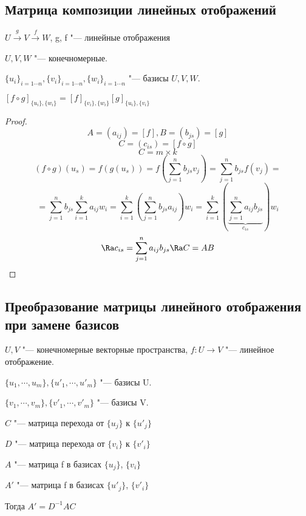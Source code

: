 \subsection{Матрица композиции линейных отображений}
\begin{theorem}
$U\overset{g}{\rightarrow}V\overset{f}{\rightarrow}W$, g, f "--- линейные отображения

$U, V, W$ "--- конечномерные.

$\{u_{i}\}_{i = 1 \cdots n}, \{v_{i}\}_{i = 1 \cdots n}, \{w_{i}\}_{i = 1 \cdots n}$ "--- базисы $U, V, W$.

$[f \circ g]_{\{u_i\}, \{w_i\}} = [f]_{\{v_i\}, \{w_i\}}[g]_{\{u_i\}, \{v_i\}}$
\end{theorem}

\begin{proof}
$$A = (a_{ij}) = [f], B = (b_{js}) = [g]$$
$$C = (c_{is}) = [f \circ g] $$
$$C = m \times k$$
$$(f \circ g)(u_{s}) = f(g(u_s)) = f(\sum_{j = 1}^{n}b_{js}v_j) = \sum_{j = 1}^{n}b_{js}f(v_j) = $$
$$ = \sum_{j = 1}^{n}b_{js}\sum_{i = 1}^{k}a_{ij}w_i = \sum_{i = 1}^k(\sum_{j = 1}^{n}b_{js}a_{ij}) w_{i} = \sum_{i = 1}^{k}(\underbrace{\sum_{j = 1}^{n}a_{ij}b_{js}}_{c_{is}})w_i$$
$$\Ra c_{is} = \sum_{j = 1}^{n}a_{ij}b_{js} \Ra C = AB$$
\end{proof}

\subsection{Преобразование матрицы линейного отображения при замене базисов}

\begin{theorem}
$U, V$ "--- конечномерные векторные пространства, $f: U \to V$ "--- линейное отображение.

$\{u_1, \cdots, u_m\}, \{u'_1, \cdots, u'_m\}$  "--- базисы U.

$\{v_1, \cdots, v_m\}, \{v'_1, \cdots, v'_m\}$  "--- базисы V.

$C$ "--- матрица перехода от $\{u_j\}$ к $\{u'_j\}$

$D$ "--- матрица перехода от $\{v_i\}$ к $\{v'_i\}$

$A$ "--- матрица f в базисах $\{u_j\}$, $\{v_i\}$

$A'$ "--- матрица f в базисах $\{u'_j\}$, $\{v'_i\}$

Тогда $A' = D^{-1}AC$

\end{theorem}

